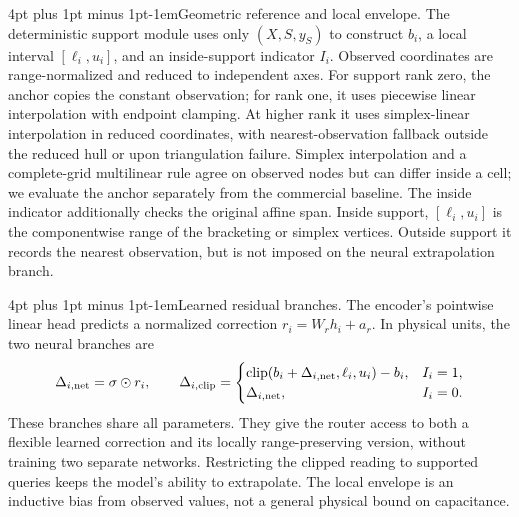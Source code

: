 \documentclass{article}
\makeatletter
\renewcommand{\paragraph}{\@startsection{paragraph}{4}{\z@}
  {4pt plus 1pt minus 1pt}{-1em}{\normalsize\bf}}
\makeatother
\begin{document}
\paragraph{Geometric reference and local envelope.}
The deterministic support module uses only $(X,S,y_S)$ to construct $b_i$,
a local interval $[\ell_i,u_i]$, and an inside-support indicator $I_i$.
Observed coordinates are range-normalized and reduced to independent axes.
For support rank zero, the anchor copies the constant observation; for rank
one, it uses piecewise linear interpolation with endpoint clamping. At higher
rank it uses simplex-linear interpolation in reduced coordinates, with
nearest-observation fallback outside the reduced hull or upon triangulation
failure. Simplex interpolation and a complete-grid multilinear rule agree on
observed nodes but can differ inside a cell; we evaluate the anchor separately
from the commercial baseline. The inside indicator additionally checks the
original affine span. Inside support, $[\ell_i,u_i]$ is the componentwise range
of the bracketing or simplex vertices. Outside support it records the nearest
observation, but is not imposed on the neural extrapolation branch.

\paragraph{Learned residual branches.}
The encoder's pointwise linear head predicts a normalized correction
$r_i=W_rh_i+a_r$. In physical units, the two neural branches are
\begin{equation}
\label{eq:learned-residual}
\Delta_{i,\rm net}=\sigma\odot r_i,\qquad
\Delta_{i,\rm clip}=\begin{cases}
 \operatorname{clip}(b_i+\Delta_{i,\rm net},\ell_i,u_i)-b_i,&I_i=1,\\
 \Delta_{i,\rm net},&I_i=0.
\end{cases}
\end{equation}
These branches share all parameters. They give the router access to both a
flexible learned correction and its locally range-preserving version, without
training two separate networks. Restricting the clipped reading to supported
queries keeps the model's ability to extrapolate. The local envelope is an
inductive bias from observed values, not a general physical bound on capacitance.
\end{document}
